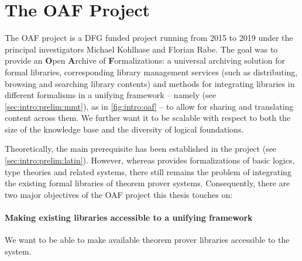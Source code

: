 \section{The OAF Project}\label{sec:intro:oaf}

The OAF project \cite{OAF:on} is a DFG funded project running from 2015 to 2019 under the principal investigators Michael Kohlhase and Florian Rabe. The goal was to provide an \textbf Open \textbf Archive of \textbf Formalizations: a universal archiving solution for formal libraries, corresponding library management services (such as distributing, browsing and searching library contents) and methods for integrating libraries in different formalisms in a unifying framework -- namely \ommt (see \autoref{sec:intro:prelim:mmt}), as in \autoref{fig:intro:oaf} -- to allow for sharing and translating content across them. We further want it to be scalable with respect to both the size of the knowledge base and the diversity of logical foundations.

Theoretically, the main prerequisite has been established in the \latin project (see \autoref{sec:intro:prelim:latin}).
However, whereas \latin provides formalizations of basic logics, type theories and related systems, there still remains the problem of integrating the existing formal libraries of theorem prover systems. Consequently, there are two major objectives of the OAF project this thesis touches on:

\paragraph{Making existing libraries accessible to a unifying framework} We want to be able to make available theorem prover libraries accessible to the \mmt system.


